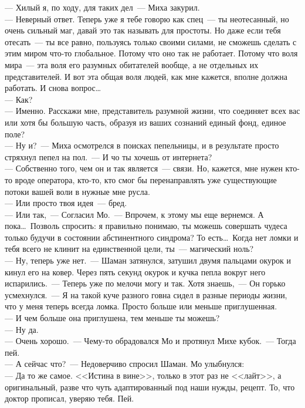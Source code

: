 --- Хилый я, по ходу, для таких дел~--- Миха закурил.\\
--- Неверный ответ. Теперь уже я тебе говорю как спец~--- ты неотесанный, но 
очень сильный маг, давай это так называть для простоты. Но даже если тебя отесать~--- 
ты все равно, пользуясь только своими силами, не сможешь сделать с этим миром 
что-то глобальное. Потому что оно так не работает. Потому что воля мира~--- эта 
воля его разумных обитателей вообще, а не отдельных их представителей. И вот 
эта общая воля людей, как мне кажется, вполне должна работать. И снова вопрос\ldots\\
--- Как?\\
--- Именно. Расскажи мне, представитель разумной жизни, что соединяет всех вас 
или хотя бы большую часть, образуя из ваших сознаний единый фонд, единое поле?\\
--- Ну и?~--- Миха осмотрелся в поисках пепельницы, и в результате просто 
стряхнул пепел на пол.~--- И чо ты хочешь от интернета?\\
--- Собственно того, чем он и так является~--- связи. Но, кажется, мне нужен 
кто-то вроде оператора, кто-то, кто смог бы перенаправлять уже существующие потоки 
вашей воли в нужные мне русла.\\
--- Или просто твоя идея~--- бред.\\
--- Или так,~--- Согласил Мо.~--- Впрочем, к этому мы еще вернемся. А пока\ldots\ 
Позволь спросить: я правильно понимаю, ты можешь совершать чудеса только будучи в 
состоянии абстинентного синдрома? То есть\ldots\ Когда нет ломки и тебя всего 
не клинит на единственной цели, ты~--- магический ноль?\\
--- Ну, теперь уже нет.~--- Шаман затянулся, затушил двумя пальцами окурок и 
кинул его на ковер. Через пять секунд окурок и кучка пепла вокруг него 
испарились.~--- Теперь уже по мелочи могу и так. Хотя знаешь,~--- Он горько усмехнулся.~--- Я 
на такой куче разного говна сидел в разные периоды жизни, что у меня теперь всегда 
ломка. Просто больше или меньше приглушенная.\\
--- И чем больше она приглушена, тем меньше ты можешь?\\
--- Ну да.\\
--- Очень хорошо.~--- Чему-то обрадовался Мо и протянул Михе кубок.~--- Тогда пей.\\
--- А сейчас что?~--- Недоверчиво спросил Шаман. Мо улыбнулся:\\
--- Да то же самое. <<Истина в вине>>, только в этот раз не <<лайт>>, а 
оригинальный, разве что чуть адаптированный под наши нужды, рецепт. То, что доктор прописал, 
уверяю тебя. Пей.

